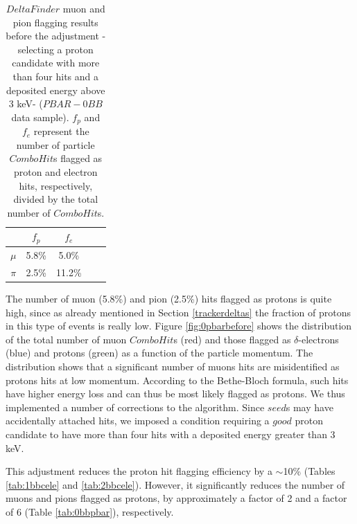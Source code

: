\begin{center}
    \begin{table}[h!]
        \centering
        \renewcommand{\arraystretch}{1.}
        \begin{tabular}{| c | c | c | c | c|} 
        \hline
        &   $f_{p}$ &   $f_{e}$\\
        \hline
        $\mu$ &  5.8\%  & 5.0\%\\
        \hline
        $\pi$ & 2.5\% &  11.2\%\\
        \hline
        \end{tabular}
        \caption{
            $DeltaFinder$ muon 
        and pion flagging results before the 
        adjustment -selecting a proton 
        candidate with more than four hits 
        and a deposited energy above 3 keV- 
        ($PBAR-0BB$ data sample). $f_p$ and 
        $f_e$ represent 
        the number of particle $ComboHit$s 
        flagged as proton and electron hits, respectively, 
        divided by the total number of $ComboHit$s.}
        \label{tab:0bbpbarbefore}
    \end{table}
\end{center}

The number of muon (5.8\%) and pion (2.5\%) hits flagged as protons is quite high,
since as already mentioned in Section \ref{trackerdeltas} the fraction 
of protons in this type of events is really low. 
Figure \ref{fig:0pbarbefore} shows the  
distribution of the total 
number of muon $ComboHit$s (red) 
and those flagged as $\delta$-electrons (blue) 
and protons (green) as a function 
of the particle momentum. 
The distribution shows that a significant number of 
muons hits are misidentified 
as protons hits at low momentum. 
According to the Bethe-Bloch formula, 
such hits have 
higher energy loss and can thus be 
most likely flagged as 
protons. We thus implemented a 
number of corrections to the algorithm. 
Since $seed$s may have 
accidentally attached hits, we imposed a 
condition requiring a $good$ proton 
candidate to have more than four 
hits with a deposited energy greater than 3 keV.

This adjustment reduces the proton hit flagging  
efficiency by a $\sim$10\% 
(Tables \ref{tab:1bbcele} and \ref{tab:2bbcele}). 
However, it significantly reduces the 
number of muons and pions flagged as 
protons, by approximately 
a factor of 2 and a factor of 6 
(Table \ref{tab:0bbpbar}), respectively.

